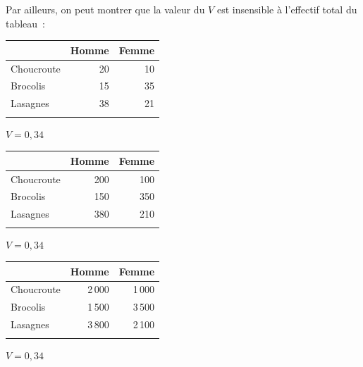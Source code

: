 \documentclass[a4paper,10pt,twoside,francais]{report}
\begin{document}
Par ailleurs, on peut montrer que la valeur du $V$ est insensible à
l'effectif total du tableau~:

\begin{center}
  \hfill
  \begin{minipage}[c]{.3\linewidth}
    \footnotesize
    \begin{center}
    \begin{tabular}[!h]{lrr}
      \toprule
      & Homme & Femme \\
      \midrule
      Choucroute & 20 & 10  \\
      Brocolis & 15 & 35  \\
      Lasagnes & 38 & 21 \\
      \bottomrule\\
    \end{tabular}
    $V=0,34$
  \end{center}
\end{minipage} 
  \hfill
  \begin{minipage}[c]{.3\linewidth}
    \footnotesize
    \begin{center}
    \begin{tabular}[!h]{lrr}
      \toprule
      & Homme & Femme \\
      \midrule
      Choucroute & 200 & 100  \\
      Brocolis & 150 & 350  \\
      Lasagnes & 380 & 210 \\
      \bottomrule\\
    \end{tabular}
    $V=0,34$
    \end{center}
\end{minipage} 
  \hfill
  \begin{minipage}[c]{.3\linewidth}
    \footnotesize
    \begin{center}
    \begin{tabular}[!h]{lrr}
      \toprule
      & Homme & Femme \\
      \midrule
      Choucroute & 2\,000 & 1\,000  \\
      Brocolis & 1\,500 & 3\,500  \\
      Lasagnes & 3\,800 & 2\,100 \\
      \bottomrule\\
    \end{tabular}
    $V=0,34$
  \end{center}
\end{minipage} 
  \hfill
\end{center}
\end{document}
